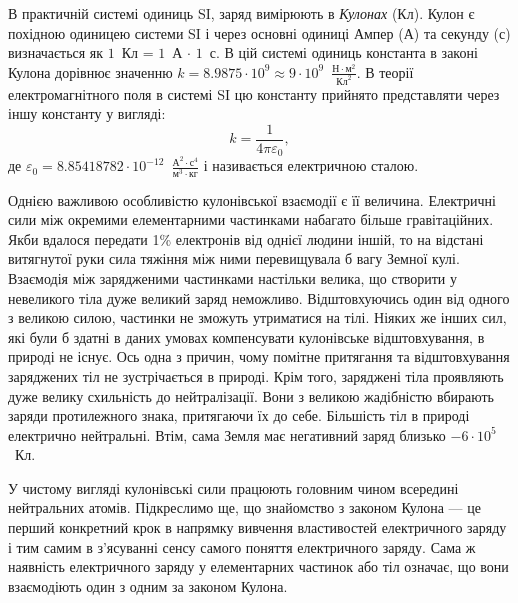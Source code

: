 \documentclass{LabWork}
\begin{document}
В практичній системі одиниць SI, заряд вимірюють в \emph{Кулонах} (Кл). Кулон є похідною одиницею системи SI і через основні одиниці Ампер (А) та секунду (с) визначається як $1$~Кл = $1$~А $\cdot$ $1$~с. В цій системі одиниць константа в законі Кулона дорівнює значенню $k = 8.9875 \cdot 10^{9} \approx 9\cdot 10^{9}$~$\frac{\text{Н}\cdot\text{м}^2}{\text{Кл}^2}$. В теорії електромагнітного поля в системі SI цю константу прийнято представляти через іншу константу у вигляді:
\begin{equation}\label{}
    k = \frac{1}{4\pi\varepsilon_0},
\end{equation}
де $\varepsilon_0 = 8.85418782 \cdot 10^{-12}$~$\frac{\text{А}^2\cdot\text{с}^4}{\text{м}^3\cdot\text{кг}}$ і називається електричною сталою.



Однією важливою особливістю кулонівської взаємодії є її величина. Елек\-тричні сили між окремими елементарними частинками набагато більше гравітаційних. Якби вдалося передати 1\% електронів
від однієї людини іншій, то на відстані витягнутої руки сила тяжіння між ними перевищувала б вагу Земної кулі.  Взаємодія між зарядженими частинками настільки велика, що створити у невеликого тіла дуже великий заряд неможливо. Відштовхуючись один від одного з великою силою, частинки не зможуть утриматися на тілі. Ніяких же інших сил, які були б здатні в даних умовах компенсувати кулонівське відштовхування, в природі не існує. Ось одна з причин, чому помітне притягання та відштовхування заряджених тіл не зустрічається в природі. Крім того, заряджені тіла проявляють дуже велику схильність до нейтралізації. Вони з великою жадібністю вбирають заряди протилежного знака, притягаючи їх до себе. Більшість тіл в природі електрично нейтральні. Втім, сама Земля має негативний заряд близько $ - 6\cdot 10^5$~Кл. 

У чистому вигляді кулонівські сили працюють головним чином всередині нейтральних атомів.  Підкреслимо ще, що знайомство з законом Кулона --- це перший конкретний крок в напрямку вивчення властивостей електричного заряду і тим самим в з'ясуванні сенсу самого поняття електричного заряду. Сама ж наявність електричного заряду у елементарних частинок або тіл означає, що вони взаємодіють один з одним за законом Кулона.
\end{document}
